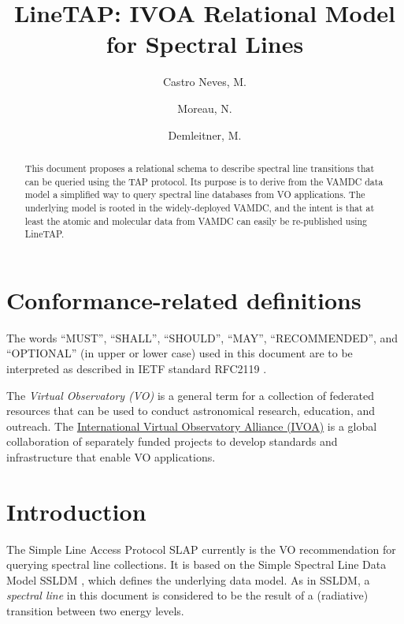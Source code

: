 \documentclass[11pt,a4paper]{ivoa}
\title{LineTAP: IVOA Relational Model for Spectral Lines}
\author{Castro Neves, M.}
\author{Moreau, N.}
\author{Demleitner, M.}
\begin{document}
\begin{abstract}

This document proposes a relational schema to describe spectral line
transitions that can be queried using the TAP protocol. Its purpose is
to derive from the VAMDC data model a simplified way to query
spectral line databases from VO applications. The underlying model is
rooted in the widely-deployed VAMDC, and the intent is that at least the
atomic and molecular data from VAMDC can easily be re-published using
LineTAP.


\end{abstract}




\section*{Conformance-related definitions}

The words ``MUST'', ``SHALL'', ``SHOULD'', ``MAY'', ``RECOMMENDED'', and
``OPTIONAL'' (in upper or lower case) used in this document are to be
interpreted as described in IETF standard RFC2119 \citep{std:RFC2119}.

The \emph{Virtual Observatory (VO)} is a
general term for a collection of federated resources that can be used
to conduct astronomical research, education, and outreach.
The \href{http://www.ivoa.net}{International
Virtual Observatory Alliance (IVOA)} is a global
collaboration of separately funded projects to develop standards and
infrastructure that enable VO applications.


\section{Introduction}

The Simple Line Access Protocol SLAP \citep{2010ivoa.specQ1209O}
currently is the VO
recommendation for querying spectral line collections.
It is based on the Simple Spectral Line Data
Model SSLDM \citep{2010ivoa.spec.1209O}, which defines the underlying
data model.
As  in SSLDM, a \emph{spectral line} in this document is considered to
be the result of a (radiative) transition between two energy levels.
\end{document}
